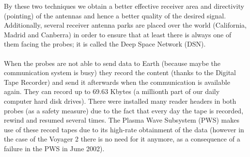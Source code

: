 \documentclass[11pt,a4paper]{article}
\begin{document}
By these two techniques we obtain a better effective receiver area and directivity (pointing) of the antennas and hence a better quality of the desired signal. Additionally, several receiver antenna parks are placed over the world (California, Madrid and Canberra) in order to ensure that at least there is always one of them facing the probes; it is called the Deep Space Network (DSN).
\\\\
When the probes are not able to send data to Earth (because maybe the communication system is busy) they record the content (thanks to the Digital Tape Recorder) and send it afterwards when the communication is available again. They can record up to 69.63 Kbytes (a millionth part of our daily computer hard disk drives). There were installed many reader headers in both probes (as a safety measure) due to the fact that every day the tape is recorded, rewind and resumed several times. The Plasma Wave Subsystem (PWS) makes use of these record tapes due to its high-rate obtainment of the data (however in the case of the Voyager 2 there is no need for it anymore, as a consequence of a failure in the PWS in June 2002).
\end{document}
